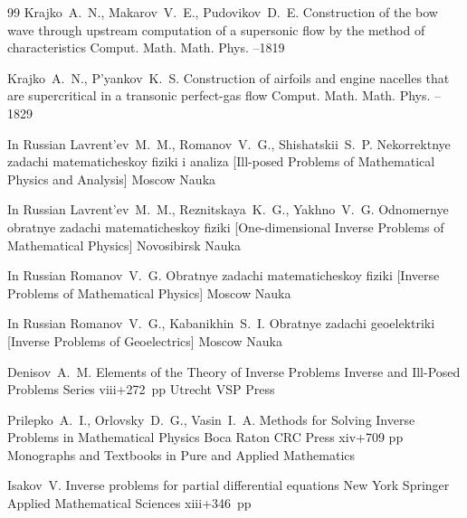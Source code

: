 \begin{thebibliography}{99}
\by Krajko~A.~N., Makarov~V.~E., Pudovikov~D.~E.
\paper Construction of the bow wave through upstream computation of a supersonic flow by the method of characteristics
\jour Comput. Math. Math. Phys.
--1819

\by Krajko~A.~N., P'yankov~K.~S.
\paper Construction of airfoils and engine nacelles that are supercritical in a transonic perfect-gas flow
\jour Comput. Math. Math. Phys.
--1829

\lang In Russian
\by Lavrent'ev~M.~M., Romanov~V.~G., Shishatskii~S.~P.
\book Nekorrektnye zadachi matematicheskoy fiziki i analiza \rm [Ill-posed Problems of Mathematical Physics and Analysis]
\publaddr Moscow
\publ Nauka

\lang In Russian
\by Lavrent'ev~M.~M., Reznitskaya~K.~G., Yakhno~V.~G.
\book Odnomernye obratnye zadachi matematicheskoy fiziki \rm [One-dimensional Inverse Problems of Mathematical Physics]
\publaddr Novosibirsk
\publ Nauka


\lang In Russian
\by Romanov~V.~G.
\book Obratnye zadachi matematicheskoy fiziki \rm [Inverse Problems of Mathematical Physics]
\publaddr Moscow
\publ Nauka

\lang In Russian
\by Romanov~V.~G., Kabanikhin~S.~I.
\book Obratnye zadachi geoelektriki \rm [Inverse Problems of Geoelectrics]
\publaddr Moscow
\publ Nauka


\by Denisov~A.~M.
\book  Elements of the Theory of Inverse Problems
\serial Inverse and Ill-Posed Problems Series 
\totalpages viii+272~pp \nofrills
\publaddr Utrecht
\publ VSP Press

\by  Prilepko~A.~I., Orlovsky~D.~G., Vasin~I.~A.
\book Methods for Solving Inverse Problems in Mathematical Physics
\publaddr Boca Raton 
\publ  CRC Press 
\totalpages xiv+709 pp \nofrills
\serial Monographs and Textbooks in Pure and Applied Mathematics

\by Isakov~V. 
\book Inverse problems for partial differential equations
\publaddr New York
\publ Springer
\serial Applied Mathematical Sciences
\totalpages xiii+346~pp \nofrills


\end{thebibliography}
